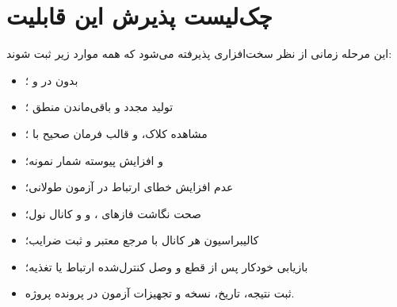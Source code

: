 \section{چک‌لیست پذیرش این قابلیت}
این مرحله زمانی از نظر سخت‌افزاری پذیرفته می‌شود که همه موارد زیر ثبت شوند:

\begin{itemize}
  \item {} بدون  در  و ؛
  \item تولید مجدد  و باقی‌ماندن منطق ؛
  \item مشاهده کلاک،  و قالب فرمان صحیح با ؛
  \item {} و افزایش پیوسته شمار نمونه؛
  \item عدم افزایش خطای ارتباط در آزمون طولانی؛
  \item صحت نگاشت فازهای ،  و  و کانال نول؛
  \item کالیبراسیون هر کانال با مرجع معتبر و ثبت ضرایب؛
  \item بازیابی خودکار پس از قطع و وصل کنترل‌شده ارتباط یا تغذیه؛
  \item ثبت نتیجه، تاریخ، نسخه  و تجهیزات آزمون در پرونده پروژه.
\end{itemize}
